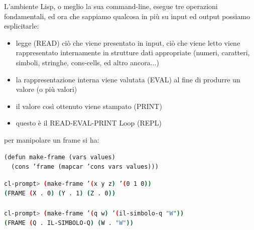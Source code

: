 \documentclass[a4paper,12pt, oneside]{book}
\begin{document}
L'ambiente Lisp, o meglio la sua command-line, esegue tre operazioni fondamentali, ed ora che sappiamo qualcosa in più su input ed output possiamo esplicitarle:
\begin{itemize}
\item legge (READ) ciò che viene presentato in input, ciò che viene letto viene rappresentato internamente in strutture dati appropriate (numeri, caratteri, simboli, stringhe, cons-cells, ed altro ancora...) 
\item la rappresentazione interna viene valutata (EVAL) al fine di produrre un valore (o più valori)
\item il valore così ottenuto viene stampato (PRINT)
\item questo è il READ-EVAL-PRINT Loop (REPL)
\end{itemize}
per manipolare un frame si ha:
\begin{verbatim}
(defun make-frame (vars values)
  (cons ’frame (mapcar ’cons vars values)))
\end{verbatim}
\begin{shaded}
\begin{lstlisting}[language=bash]
cl-prompt> (make-frame ’(x y z) ’(0 1 0))
(FRAME (X . 0) (Y . 1) (Z . 0))

cl-prompt> (make-frame ’(q w) ’(il-simbolo-q "W"))
(FRAME (Q . IL-SIMBOLO-Q) (W . "W"))
\end{lstlisting}
\end{shaded}
\end{document}
